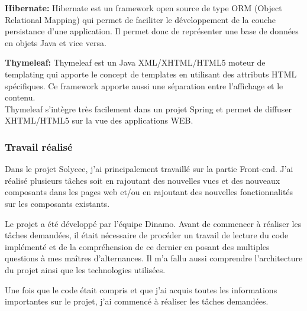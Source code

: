 \documentclass[12pt]{article}
\begin{document}
\textbf{Hibernate: } Hibernate est un framework open source de type ORM (Object Relational Mapping) qui permet de faciliter le développement de la couche persistance d'une application. Il permet donc de représenter une base de données en objets Java et vice versa.

\textbf{Thymeleaf:} Thymeleaf est un Java XML/XHTML/HTML5 moteur de templating qui apporte le concept de templates en utilisant des attributs HTML spécifiques. Ce framework apporte aussi une séparation entre l'affichage et le contenu.\\

Thymeleaf s’intègre très facilement dans un projet Spring et permet de diffuser XHTML/HTML5 sur la vue des applications WEB.


\subsubsection{Travail réalisé}


Dans le projet Solycee, j'ai principalement travaillé sur la partie Front-end. J'ai réalisé plusieurs tâches soit en rajoutant des nouvelles vues et des nouveaux composants dans les pages web et/ou en rajoutant des nouvelles fonctionnalités sur les composants existants.

Le projet a été développé par l'équipe Dinamo. Avant de commencer à réaliser les tâches demandées, il était nécessaire de procéder un travail  de lecture du code implémenté et de la compréhension de ce dernier en posant des multiples questions à mes maîtres d'alternances. Il m'a fallu aussi comprendre l'architecture du projet ainsi que les technologies utilisées. 

Une fois que le code était compris et que j'ai acquis toutes les informations importantes sur le projet, j'ai commencé à réaliser les tâches demandées.
\end{document}
